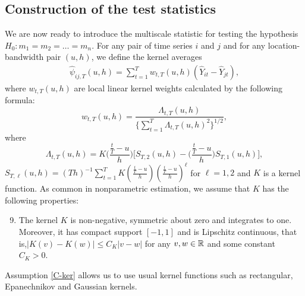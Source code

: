 \documentclass[a4paper,12pt]{article}
\makeatletter
\renewcommand{\eqref}[1]{\tagform@{\ref{#1}}}
\makeatother
\begin{document}


\subsection{Construction of the test statistics}\label{subsec:test:stat}

We are now ready to introduce the multiscale statistic for testing the hypothesis \linebreak $H_0: m_1 = m_2 = \ldots = m_n$. For any pair of time series $i$ and $j$ and for any location-bandwidth pair $(u, h)$, we define the kernel averages
\begin{align}\label{eq:psi_hat_ij}
 \widehat{\psi}_{ij, T}(u, h) = \sum\limits_{t=1}^T w_{t,T}(u, h)(\widehat{Y}_{it} - \widehat{Y}_{jt}),
 \end{align}
where $w_{t,T}(u, h)$ are local linear kernel weights calculated by the following formula:
\begin{equation}\label{eq:weights}
w_{t,T}(u, h) = \frac{\Lambda_{t,T}(u, h)}{ \{\sum\nolimits_{t=1}^T \Lambda_{t,T}(u, h)^2 \}^{1/2} }, 
\end{equation}
where
\[ \Lambda_{t,T}(u, h) = K\Big(\frac{\frac{t}{T}-u}{h}\Big) \Big[ S_{T,2}(u, h) - \Big(\frac{\frac{t}{T}-u}{h}\Big) S_{T,1}(u, h) \Big], \]
$S_{T,\ell}(u, h) = (Th)^{-1} \sum\nolimits_{t=1}^T K(\frac{\frac{t}{T}-u}{h}) (\frac{\frac{t}{T}-u}{h})^\ell$ for $\ell = 1,2$ and $K$ is a kernel function. As common in nonparametric estimation, we assume that $K$ has the following properties: 
\begin{enumerate}[label=(C\arabic*),leftmargin=1.05cm]
\setcounter{enumi}{8}
\item \label{C-ker} The kernel $K$ is non-negative, symmetric about zero and integrates to one. Moreover, it has compact support $[-1,1]$ and is Lipschitz continuous, that is,\linebreak $|K(v) - K(w)| \le C_K |v-w|$ for any $v, w \in \mathbb{R}$ and some constant $C_K > 0$.
\end{enumerate} 
Assumption \ref{C-ker} allows us to use usual kernel functions such as rectangular, Epanechnikov and Gaussian kernels.
\end{document}
